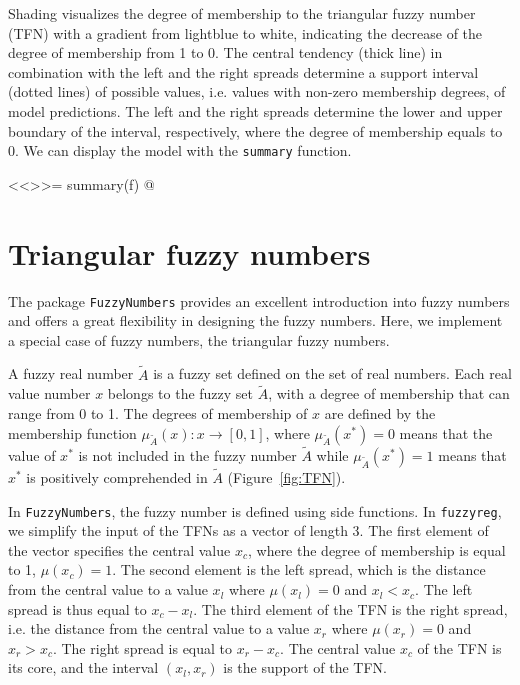 \documentclass[a4paper]{article}
\begin{document}
Shading visualizes the degree of membership to the triangular fuzzy number (TFN) with a gradient from lightblue to white,
indicating the decrease of the degree of membership from 1 to 0.
The central tendency (thick line) in combination with the left and the right spreads
determine a support interval (dotted lines) of possible values, i.e. values with non-zero membership
degrees, of model predictions. The left and the right spreads determine the lower
and upper boundary of the interval, respectively, where the degree of membership equals to 0.
We can display the model with the \texttt{summary} function.

<<>>=
summary(f)
@

\section{Triangular fuzzy numbers}

The package \texttt{FuzzyNumbers} \cite{ref:FuzzyNumbers} provides an excellent
introduction into fuzzy numbers and offers a great flexibility in designing the fuzzy
numbers. Here, we implement a special case of fuzzy numbers, the triangular fuzzy numbers.

A fuzzy real number $\tilde{A}$ is a fuzzy set defined on the set of real numbers.
Each real value number $x$ belongs to the fuzzy set $\tilde{A}$, with a
degree of membership that can range from 0 to 1. The degrees of membership of
$x$ are defined by the membership function $\mu_{\tilde{A}}(x):x\to[0,1]$,
where $\mu_{\tilde{A}}(x^*)=0$ means that the value of $x^*$ is not included in the fuzzy
number $\tilde{A}$ while $\mu_{\tilde{A}}(x^*)=1$ means that $x^*$ is positively
comprehended in $\tilde{A}$ (Figure~\ref{fig:TFN}).

In \texttt{FuzzyNumbers}, the fuzzy number is defined using side functions. In
\texttt{fuzzyreg}, we simplify the input of the TFNs as a vector
of length 3. The first element of the vector specifies the central value $x_c$, where the degree of
membership is equal to 1, $\mu(x_c)=1$. The second element is the left spread, which is
the distance from the central value to a value $x_l$ where $\mu(x_l)=0$ and $x_l<x_c$.
The left spread is thus equal to $x_c-x_l$. The third element of the TFN is the right
spread, i.e. the distance from the central value to a value $x_r$ where $\mu(x_r)=0$ and
$x_r>x_c$. The right spread is equal to $x_r-x_c$. The central value $x_c$ of the TFN is
its core, and the interval $(x_l,x_r)$ is the support of the TFN.
\end{document}
